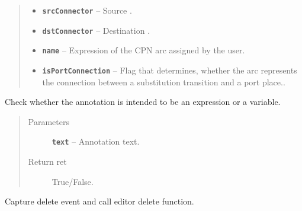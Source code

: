 \documentclass[a4paper,10pt,english]{sphinxmanual}
\begin{document}
\begin{fulllineitems}
\begin{fulllineitems}
\begin{quote}
\begin{description}
\begin{itemize}
\item {} 
\textbf{\texttt{srcConnector}} -- Source .

\item {} 
\textbf{\texttt{dstConnector}} -- Destination .

\item {} 
\textbf{\texttt{name}} -- Expression of the CPN arc assigned by the user.

\item {} 
\textbf{\texttt{isPortConnection}} -- Flag that determines, whether the arc represents the connection between a substitution transition and a port place..

\end{itemize}

\end{description}\end{quote}

\end{fulllineitems}


\begin{fulllineitems}
\label{model_link:model.ArcItem.ArcItem.checkForExpression}
Check whether the annotation is intended to be an expression or a variable.
\begin{quote}\begin{description}
\item[{Parameters}] \leavevmode
\textbf{\texttt{text}} -- Annotation text.

\item[{Return ret}] \leavevmode
True/False.

\end{description}\end{quote}

\end{fulllineitems}


\begin{fulllineitems}
\label{model_link:model.ArcItem.ArcItem.deleteItemLocal}
Capture delete event and call editor delete function.

\end{fulllineitems}


\end{fulllineitems}
\end{document}
